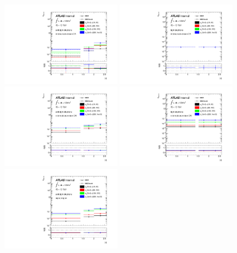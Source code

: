 \begin{figure}[tb!]
  \centering
  {\includegraphics[width=0.45\textwidth]{figures/qmisid/crateMCZ_MCZtruth_atight_m0}}
  {\includegraphics[width=0.45\textwidth]{figures/qmisid/crateMCZ_MCZtruth_tight_m0}}\\
  {\includegraphics[width=0.45\textwidth]{figures/qmisid/crateMCZ_MCZtruth_atight_m1}}
  {\includegraphics[width=0.45\textwidth]{figures/qmisid/crateMCZ_MCZtruth_tight_m1}}\\
  {\includegraphics[width=0.45\textwidth]{figures/qmisid/crateMCZ_MCZtruth_atight_m2}}

\end{figure}
